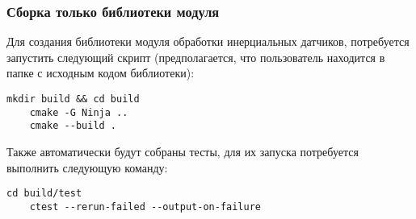 \subsubsection{Сборка только библиотеки модуля}

Для создания библиотеки модуля обработки инерциальных датчиков, потребуется запустить следующий скрипт
(предполагается, что пользователь находится в папке с исходным кодом библиотеки):

\begin{lstlisting}[basicstyle=\ttfamily\small]
    mkdir build && cd build
    cmake -G Ninja ..
    cmake --build .
\end{lstlisting}

Также автоматически будут собраны тесты, для их запуска потребуется выполнить следующую команду:

\begin{lstlisting}[basicstyle=\ttfamily\small]
    cd build/test
    ctest --rerun-failed --output-on-failure
\end{lstlisting}
